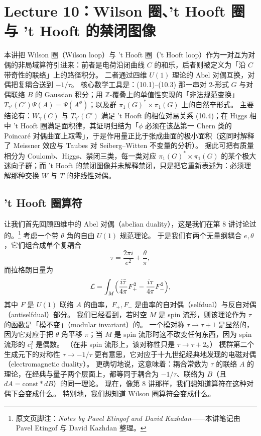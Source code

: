 \section{Lecture 10：Wilson 圈、't Hooft 圈与 't Hooft 的禁闭图像}

\begin{keytakeaways}
本讲把 Wilson 圈（Wilson loop）与 't Hooft 圈（'t Hooft loop）作为一对互为对偶的非局域算符引进来：前者是电荷沿闭曲线 $C$ 的和乐，后者则被定义为「沿 $C$ 带奇性的联络」上的路径积分。
二者通过四维 $U(1)$ 理论的 Abel 对偶互换，对偶把复耦合送到 $-1/\tau$。
核心数学工具是：(10.1)–(10.3) 那一串对 2-形式 $G$ 与对偶联络 $B$ 的 Gaussian 积分；用 $\mathbb{Z}$-覆叠上的单值性实现的「非法规范变换」$T_{\gamma'}(C')\Psi(A)=\Psi(A^\phi)$；以及群 $\pi_1(G)^*\times\pi_1(G)$ 上的自然辛形式。
主要结论有：$W_\gamma(C)$ 与 $T_{\gamma'}(C')$ 满足 't Hooft 的相位对易关系 (10.4)；在 Higgs 相中 't Hooft 圈满足面积律，其证明归结为「$\phi$ 必须在该丛第一 Chern 类的 Poincaré 对偶曲面上取零」，于是作用量正比于张成曲面的极小面积（这同时解释了 Meissner 效应与 Taubes 对 Seiberg–Witten 不变量的分析）。
据此可把有质量相分为 Coulomb、Higgs、禁闭三类，每一类对应 $\pi_1(G)^*\times\pi_1(G)$ 的某个极大迷向子群；而 't Hooft 的禁闭图像并未解释禁闭，只是把它重新表述为：必须理解那种交换 $W$ 与 $T$ 的非线性对偶。
\end{keytakeaways}

\subsection{'t Hooft 圈算符}

让我们首先回顾四维中的 Abel 对偶（abelian duality），这是我们在第 8 讲讨论过的。\footnote{原文页脚注：\emph{Notes by Pavel Etingof and David Kazhdan}——本讲笔记由 Pavel Etingof 与 David Kazhdan 整理。}
考虑一个带 $\theta$ 角的自由 $U(1)$ 规范理论。
于是我们有两个无量纲耦合 $e,\theta$，它们组合成单个复耦合
\[
\tau=\frac{2\pi i}{e^2}+\frac{\theta}{\pi},
\]
而拉格朗日量为
\[
\mathcal{L}=\int_M\Bigl(\frac{i\bar\tau}{4\pi}F_+^2-\frac{i\tau}{4\pi}F_-^2\Bigr),
\]
其中 $F$ 是 $U(1)$ 联络 $A$ 的曲率，$F_+,F_-$ 是曲率的自对偶（selfdual）与反自对偶（antiselfdual）部分。
我们已经看到，若时空 $M$ 是 spin 流形，则该理论作为 $\tau$ 的函数是「模不变」（modular invariant）的。
一个模对称 $\tau\to\tau+1$ 是显然的，因为它对应于把 $\theta$ 角平移 $\pi$；当 $M$ 是 spin 流形时这不改变任何东西，因为 spin 流形的 $c_1^2$ 是偶数。
（在非 spin 流形上，该对称性只是 $\tau\to\tau+2$。）
模群第二个生成元下的对称性 $\tau\to-1/\tau$ 更有意思，它对应于十九世纪经典地发现的电磁对偶（electromagnetic duality）。
更确切地说，这意味着：耦合常数为 $\tau$ 的联络 $A$ 的理论，在经典与量子两个层面上，都等同于耦合为 $-1/\tau$、联络为 $B$（且 $dA=\mathrm{const}\ast dB$）的同一理论。
现在，像第 8 讲那样，我们想知道算符在这种对偶下会变成什么。
特别地，我们想知道 Wilson 圈算符会变成什么。

